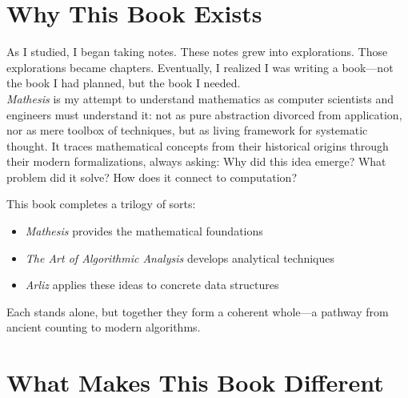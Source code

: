 \section*{Why This Book Exists}

As I studied, I began taking notes. These notes grew into explorations. Those explorations became chapters. Eventually, I realized I was writing a book—not the book I had planned, but the book I needed.\\
\textit{Mathesis} is my attempt to understand mathematics as computer scientists and engineers must understand it: not as pure abstraction divorced from application, nor as mere toolbox of techniques, but as living framework for systematic thought. It traces mathematical concepts from their historical origins through their modern formalizations, always asking: Why did this idea emerge? What problem did it solve? How does it connect to computation?

This book completes a trilogy of sorts:
\begin{itemize}
    \item \textit{Mathesis} provides the mathematical foundations
    \item \textit{The Art of Algorithmic Analysis} develops analytical techniques
    \item \textit{Arliz} applies these ideas to concrete data structures
\end{itemize}

Each stands alone, but together they form a coherent whole—a pathway from ancient counting to modern algorithms.

\section*{What Makes This Book Different}

